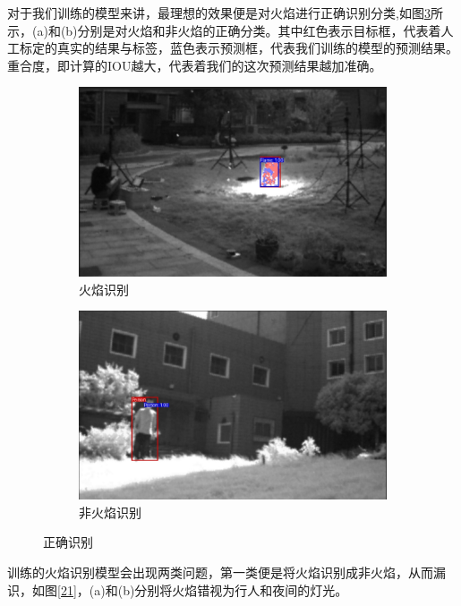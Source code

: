 对于我们训练的模型来讲，最理想的效果便是对火焰进行正确识别分类,如图\ref{20}所示，(a)和(b)分别是对火焰和非火焰的正确分类。其中红色表示目标框，代表着人工标定的真实的结果与标签，蓝色表示预测框，代表我们训练的模型的预测结果。重合度，即计算的IOU越大，代表着我们的这次预测结果越加准确。
\begin{figure}[ht]
    \centering
    \begin{subfigure}{0.49\textwidth}
        \centering
        \includegraphics[width=\textwidth]{figures/jiance1.png}
        \caption{火焰识别}
        \label{20.a}
    \end{subfigure}
    \hfill
    \begin{subfigure}{0.49\textwidth}
        \centering
        \includegraphics[width=\textwidth]{figures/jiance8.png}
        \caption{非火焰识别}
        \label{20.b}
    \end{subfigure}
    \caption{正确识别}
    \label{20}
\end{figure}
训练的火焰识别模型会出现两类问题，第一类便是将火焰识别成非火焰，从而漏识，如图\ref{21}，(a)和(b)分别将火焰错视为行人和夜间的灯光。
